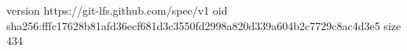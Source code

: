 version https://git-lfs.github.com/spec/v1
oid sha256:fffc17628b81afd36ecf681d3c3550fd2998a820d339a604b2c7729c8ac4d3e5
size 434
